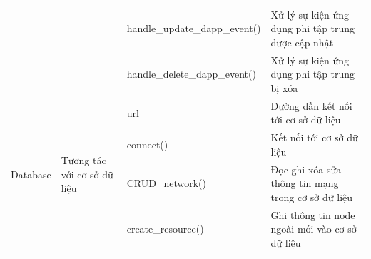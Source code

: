 \documentclass[../DoAn.tex]{subfiles}
\begin{document}
\begin{longtable}{|p{}|p{}|p{}|p{}|}
                                                 &                                                                                  & \hspace{0pt}handle\_\hspace{0pt}update\_\hspace{0pt}dapp\_\hspace{0pt}event()     & Xử lý sự kiện ứng dụng phi tập trung được cập nhật                                                \\ \cline{3-4}
                                                 &                                                                                  & \hspace{0pt}handle\_\hspace{0pt}delete\_\hspace{0pt}dapp\_\hspace{0pt}event()     & Xử lý sự kiện ứng dụng phi tập trung bị xóa                                                \\ \hline
    \multirow[t]{5}{0.2\textwidth}{Database}     & \multirow[t]{5}{0.2\textwidth}{Tương tác với cơ sở dữ liệu}                      & \hspace{0pt}url                                                                   & Đường dẫn kết nối tới cơ sở dữ liệu                                                          \\ \cline{3-4}
                                                 &                                                                                  & \hspace{0pt}connect\hspace{0pt}()                                                 & Kết nối tới cơ sở dữ liệu                                                                    \\ \cline{3-4}
                                                 &                                                                                  & \hspace{0pt}CRUD\_network\hspace{0pt}()                                           & Đọc ghi xóa sửa thông tin mạng trong cơ sở dữ liệu                                           \\ \cline{3-4}
                                                 &                                                                                  & \hspace{0pt}create\_resource\hspace{0pt}()                                        & Ghi thông tin node ngoài mới vào cơ sở dữ liệu                                               \\ \cline{3-4}

\end{longtable}
\end{document}
